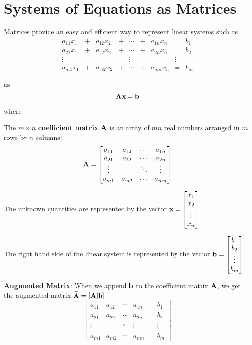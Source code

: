 \documentclass[
  letterpaper,
]{book}
\theoremstyle{definition}
\theoremstyle{definition}
\theoremstyle{plain}
\theoremstyle{definition}
\theoremstyle{plain}
\theoremstyle{plain}
\theoremstyle{remark}
\begin{document}
\hypertarget{systems-of-equations-as-matrices}{%
\section{Systems of Equations as
Matrices}\label{systems-of-equations-as-matrices}}

Matrices provide an easy and efficient way to represent linear systems
such as \[\begin{matrix}
        a_{11}x_1  & + & a_{12}x_2 & + & \cdots & + & a_{1n}x_n & = & b_1\\
        a_{21}x_1  & + & a_{22}x_2 & + & \cdots & + & a_{2n}x_n & = & b_2\\
        \vdots     &   &     &   & \vdots &   &     & \vdots & \\
        a_{m1}x_1  & + & a_{m2}x_2 & + & \cdots & + & a_{mn}x_n & = & b_m
        \end{matrix}\]

as \[{\bf A x = b}\] where

The \(m \times n\) \textbf{coefficient matrix} \({\bf A}\) is an array
of \(m n\) real numbers arranged in \(m\) rows by \(n\) columns:
\[{\bf A}=\begin{bmatrix}
    a_{11} & a_{12} & \cdots & a_{1n} \\
    a_{21} & a_{22} & \cdots & a_{2n} \\
    \vdots &  & \ddots & \vdots \\
    a_{m1} & a_{m2} & \cdots & a_{mn}
    \end{bmatrix}\]

The unknown quantities are represented by the vector
\({\bf x}=\begin{bmatrix} x_1\\x_2\\\vdots\\x_n \end{bmatrix}\).

The right hand side of the linear system is represented by the vector
\({\bf b}=\begin{bmatrix} b_1\\b_2\\\vdots\\b_m \end{bmatrix}\).

\textbf{Augmented Matrix}: When we append \(\bf b\) to the coefficient
matrix \(\bf A\), we get the augmented matrix
\(\widehat{\bf A}=[\bf A | b]\) \[\begin{bmatrix}
    a_{11} & a_{12} & \cdots & a_{1n} & | & b_1\\
    a_{21} & a_{22} & \cdots & a_{2n} & | & b_2\\
    \vdots &  & \ddots & \vdots & | & \vdots\\
    a_{m1} & a_{m2} & \cdots & a_{mn} & | & b_m
    \end{bmatrix}\]
\end{document}
